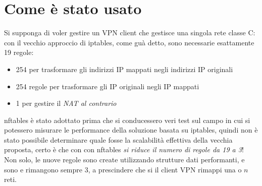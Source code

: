 \section{Come è stato usato}
Si supponga di voler gestire un VPN client che gestisce una singola rete classe C:
con il vecchio approccio di iptables, come guà detto, sono necessarie esattamente
19 regole:
\begin{itemize}
  \item 254 per trasformare gli indirizzi IP mappati negli indirizzi IP originali
  \item 254 regole per trasformare gli IP originali negli IP mappati
  \item 1 per gestire il \textit{NAT al contrario}
\end{itemize}
nftables è stato adottato prima che si conducessero veri test sul campo
in cui si potessero misurare le performance della soluzione basata su iptables,
quindi
non è stato possibile determinare quale fosse la scalabilità effettiva della vecchia
proposta, certo è che con con nftables \textit{si riduce il numero di regole
da 19 a 3}! Non solo, le nuove regole sono create utilizzando strutture
dati performanti, e sono e rimangono sempre 3, a prescindere che si il client VPN
rimappi una o $n$ reti.

